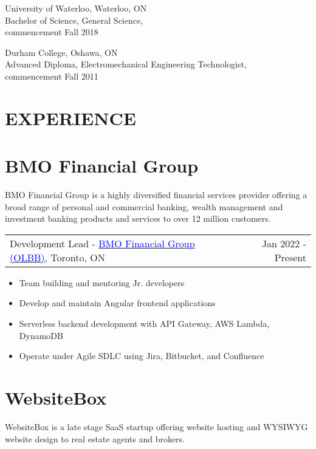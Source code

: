 \documentclass[margin]{res}
\begin{document}
\begin{resume}
	University of Waterloo, Waterloo, ON \\
	Bachelor of Science, General Science, \\
	commencement Fall 2018

	Durham College, Oshawa, ON \\
	Advanced Diploma, Electromechanical Engineering Technologist, \\
	commencement Fall 2011


	\section{\textcolor{NavyBlue}{EXPERIENCE}}

	\normalsize{\section{BMO Financial Group}}

	BMO Financial Group is a highly diversified financial services provider offering
	a broad range of personal and commercial banking, wealth management and investment
	banking products and services to over 12 million customers.

	\begin{tabular}{p{3in} r} %
		Development Lead - \href{https://bmo.com}{\textcolor{blue}{BMO Financial Group (OLBB)}}, Toronto, ON & Jan 2022 - Present
	\end{tabular}

	\begin{itemize} %
		\item Team building and mentoring Jr. developers
		\item Develop and maintain Angular frontend applications
		\item Serverless backend development with API Gateway, AWS Lambda, DynamoDB
		\item Operate under Agile SDLC using Jira, Bitbucket, and Confluence
	\end{itemize}

	\normalsize{\section{WebsiteBox}}

	WebsiteBox is a late stage SaaS startup offering website hosting and WYSIWYG
	website design to real estate agents and brokers.


\end{resume}
\end{document}
